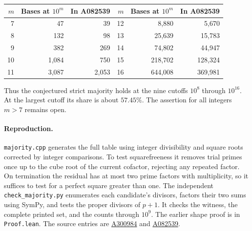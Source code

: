\documentclass[11pt]{article}
\begin{document}
\begin{center}\begin{tabular}{r@{\quad}rr|r@{\quad}rr}
\toprule
$m$ & Bases at $10^m$ & In A082539 & $m$ & Bases at $10^m$ & In A082539\\
\midrule
7 & 47 & 39 & 12 & 8,880 & 5,670\\
8 & 132 & 98 & 13 & 25,639 & 15,783\\
9 & 382 & 269 & 14 & 74,802 & 44,947\\
10 & 1,084 & 750 & 15 & 218,702 & 128,324\\
11 & 3,087 & 2,053 & 16 & 644,008 & 369,981\\
\bottomrule\end{tabular}\end{center}
Thus the conjectured strict majority holds at the nine cutoffs $10^8$ through
$10^{16}$. At the largest cutoff its share is about $57.45\%$. The assertion
for all integers $m>7$ remains open.

\paragraph{Reproduction.}
\texttt{majority.cpp} generates the full table using integer divisibility
and square roots corrected by integer comparisons. To test squarefreeness it
removes trial primes once up to the cube root of the current cofactor,
rejecting any repeated factor. On termination the residual has at most two
prime factors with multiplicity, so it suffices to test for a perfect square
greater than one. The independent \texttt{check\_majority.py} enumerates each
candidate's divisors, factors their two sums using SymPy, and tests the proper
divisors of $p+1$. It checks the witness, the complete printed set, and the
counts through $10^9$. The earlier shape proof is in \texttt{Proof.lean}.
The source entries are \href{https://oeis.org/A300984}{A300984} and
\href{https://oeis.org/A082539}{A082539}.
\end{document}
